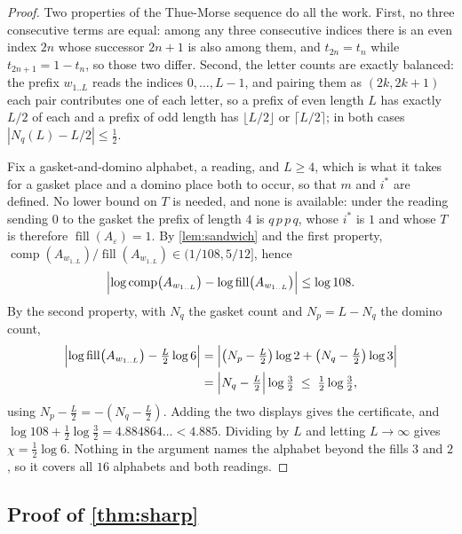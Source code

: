 \documentclass[11pt]{amsart}
\theoremstyle{definition}
\theoremstyle{remark}
\DeclareMathOperator{\comp}{comp}
\DeclareMathOperator{\fil}{fill}
\begin{document}
\begin{proof}
Two properties of the Thue-Morse sequence do all the work. First, no three consecutive terms are equal: among any three consecutive indices there is an even index $2n$ whose successor $2n+1$ is also among them, and $t_{2n} = t_n$ while $t_{2n+1} = 1 - t_n$, so those two differ. Second, the letter counts are exactly balanced: the prefix $w_{1..L}$ reads the indices $0, \dots, L-1$, and pairing them as $(2k, 2k+1)$ each pair contributes one of each letter, so a prefix of even length $L$ has exactly $L/2$ of each and a prefix of odd length has $\lfloor L/2 \rfloor$ or $\lceil L/2 \rceil$; in both cases $|N_q(L) - L/2| \le \tfrac12$.

Fix a gasket-and-domino alphabet, a reading, and $L \ge 4$, which is what it takes for a gasket place and a domino place both to occur, so that $m$ and $i^*$ are defined. No lower bound on $T$ is needed, and none is available: under the reading sending $0$ to the gasket the prefix of length $4$ is $q\,p\,p\,q$, whose $i^*$ is $1$ and whose $T$ is therefore $\fil(A_\varepsilon) = 1$. By \cref{lem:sandwich} and the first property, $\comp(A_{w_{1..L}})/\fil(A_{w_{1..L}}) \in (1/108, 5/12]$, hence
\[
\Bigl|\log\comp\bigl(A_{w_{1..L}}\bigr) - \log \fil\bigl(A_{w_{1..L}}\bigr)\Bigr| \le \log 108 .
\]
By the second property, with $N_q$ the gasket count and $N_p = L - N_q$ the domino count,
\begin{align*}
\Bigl|\log\fil\bigl(A_{w_{1..L}}\bigr) - \tfrac{L}{2}\log 6\Bigr|
&= \Bigl| \bigl(N_p - \tfrac{L}{2}\bigr)\log 2 + \bigl(N_q - \tfrac{L}{2}\bigr)\log 3\Bigr| \\
&= \Bigl|N_q - \tfrac{L}{2}\Bigr| \log\tfrac32 \;\le\; \tfrac12 \log\tfrac32 ,
\end{align*}
using $N_p - \tfrac L2 = -(N_q - \tfrac L2)$. Adding the two displays gives the certificate, and $\log 108 + \tfrac12\log\tfrac32 = 4.884864\ldots < 4.885$. Dividing by $L$ and letting $L \to \infty$ gives $\chi = \tfrac12 \log 6$. Nothing in the argument names the alphabet beyond the fills $3$ and $2$, so it covers all $16$ alphabets and both readings.
\end{proof}

\subsection{Proof of \texorpdfstring{\cref{thm:sharp}}{sharpness}}
\end{document}
